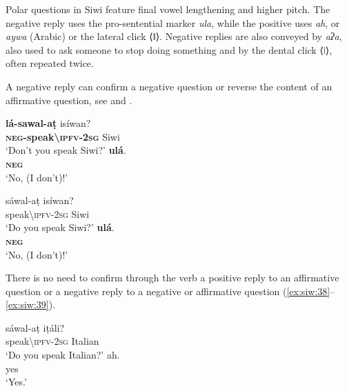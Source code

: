 \documentclass[output=paper,colorlinks,citecolor=brown]{langscibook}
\begin{document}
Polar questions in Siwi feature final vowel lengthening and higher pitch.  The negative reply uses the pro-sentential marker \textit{ula}, while the positive uses \textit{ah}, or \textit{aywa} (Arabic) or the lateral click ⟨ǁ⟩. Negative replies are also conveyed by \textit{aʔa}, also used to ask someone to stop doing something and by the dental click ⟨ǀ⟩, often repeated twice.

A negative reply can confirm a negative question or reverse the content of an affirmative question, see  and .

\ea\label{ex:siw:38}
\begin{xlist}[A: ]
        \gll \textbf{l\'{a}-sawal-aṭ} is\'{i}wan? \\
             \textbf{\textsc{neg}-speak{\textbackslash}\textsc{ipfv-2sg}} Siwi \\
        \glt ‘Don’t you speak Siwi?’
        \gll \textbf{ulá}. \\
              \textbf{\textsc{neg}} \\
        \glt ‘No, (I don’t)!’
\end{xlist}
\z

\ea\label{ex:siw:39}
\begin{xlist}[A: ]
        \gll sáwal-aṭ is\'{i}wan?  \\
             speak{\textbackslash}\textsc{ipfv-2sg} Siwi \\
        \glt ‘Do you speak Siwi?’
        \gll \textbf{ulá}. \\
             \textbf{\textsc{neg}} \\
        \glt ‘No, (I don’t)!’
\end{xlist}
\z

There is no need to confirm through the verb a positive reply to an affirmative question  or a negative reply to a negative or affirmative question (\ref{ex:siw:38}--\ref{ex:siw:39}).

\ea\label{ex:siw:40}
\begin{xlist}[A: ]
        \gll sáwal-aṭ iṭáli?  \\
             speak{\textbackslash}\textsc{ipfv}{}-2\textsc{sg} Italian  \\
        \glt ‘Do you speak Italian?’
        \gll ah. \\
             yes \\
        \glt ‘Yes.’
\end{xlist}
\z
\end{document}
